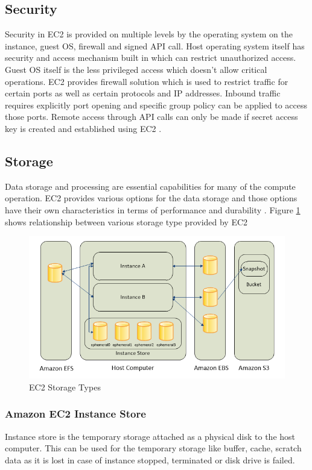 \subsection{Security}
Security in EC2 is provided on multiple levels by the operating system on the instance, guest OS, firewall and signed API call. Host operating system itself has security and access mechanism built in which can restrict unauthorized access. Guest OS itself is the less privileged access which doesn't allow critical operations. EC2 provides firewall solution which is used to restrict traffic for certain ports as well as certain protocols and IP addresses. Inbound traffic requires explicitly port opening and specific group policy can be applied to access those ports. Remote access through API calls can only be made if secret access key is created and established using EC2 \cite{www-aws-ec2Security}.

\subsection{Storage}
Data storage and processing are essential capabilities for many of the compute operation. EC2 provides various options for the data storage and those options have their own characteristics in terms of performance and durability \cite{www-aws-ec2Storage}. Figure \ref{f:ec2-storage} shows relationship between various storage type provided by EC2
\begin{figure}[!ht]
  \centering\includegraphics[width=\columnwidth]{images/ec2Storage.PNG}
  \caption{EC2 Storage Types \cite{www-aws-ec2Storage}}\label{f:ec2-storage}
\end{figure}

\subsubsection{Amazon EC2 Instance Store} 
Instance store \cite{www-aws-ec2Storage} is the temporary storage attached as a physical disk to the host computer. This can be used for the temporary storage like buffer, cache, scratch data as it is lost in case of instance stopped, terminated or disk drive is failed.
